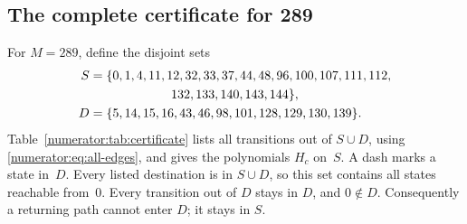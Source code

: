 \subsection{The complete certificate for 289}

For $M=289$, define the disjoint sets
\begin{align*}
 S={}&\{0,1,4,11,12,32,33,37,44,48,96,100,107,111,112,\\
     &\hspace{18mm}132,133,140,143,144\},\\
 D={}&\{5,14,15,16,43,46,98,101,128,129,130,139\}.
\end{align*}
Table~\ref{numerator:tab:certificate} lists all transitions out of
$S\cup D$, using \eqref{numerator:eq:all-edges}, and gives the
polynomials $H_c$ on~$S$. A dash marks a state in~$D$.
Every listed destination is in $S\cup D$, so this set contains all
states reachable from~0. Every transition out of $D$ stays in $D$,
and $0\notin D$. Consequently a returning path cannot enter $D$;
it stays in $S$.

